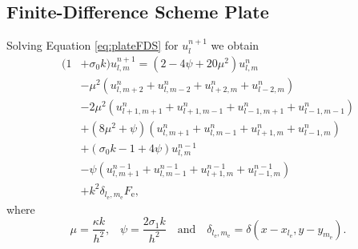 \documentclass{article}
\begin{document}
\subsection{Finite-Difference Scheme Plate}
Solving Equation \eqref{eq:plateFDS} for $u_l^{n+1}$ we obtain
\begin{equation}
    \begin{aligned}\label{eq:plateImplementation}
        (1& + \sigma_0k)u_{l,m}^{n+1} = (2 - 4\psi + 20\mu^2)u_{l,m}^n\\
    &-\mu^2 (u_{l,m + 2}^n + u_{l,m - 2}^n + u_{l + 2,m}^n + u_{l - 2,m}^n)\\
    &- 2\mu^2(u_{l + 1,m + 1}^n + u_{l + 1,m - 1}^n + u_{l - 1,m + 1}^n + u_{l - 1,m - 1}^n)\\
    &+ (8\mu^2 + \psi)(u_{l,m + 1}^n + u_{l,m - 1}^n + u_{l + 1,m}^n + u_{l - 1,m}^n)\\
    &+ (\sigma_0 k - 1 + 4\psi) u_{l,m}^{n-1}\\
    &- \psi(u_{l,m + 1}^{n-1} + u_{l,m - 1}^{n-1} + u_{l + 1,m}^{n-1} + u_{l - 1,m}^{n-1})\\
    &+ k^2 \delta_{l_\text{e}, m_\text{e}}F_\text{e},
\end{aligned}
\end{equation}
where
\begin{equation}\nonumber
    \mu = \frac{\kappa k}{h^2} \text{,} \quad \psi = \frac{2\sigma_1k}{h^2} \quad \text{and} \quad \delta_{l_\text{e}, m_\text{e}} = \delta(x - x_{l_\text{e}}, y - y_{m_\text{e}}).
\end{equation}
\end{document}
